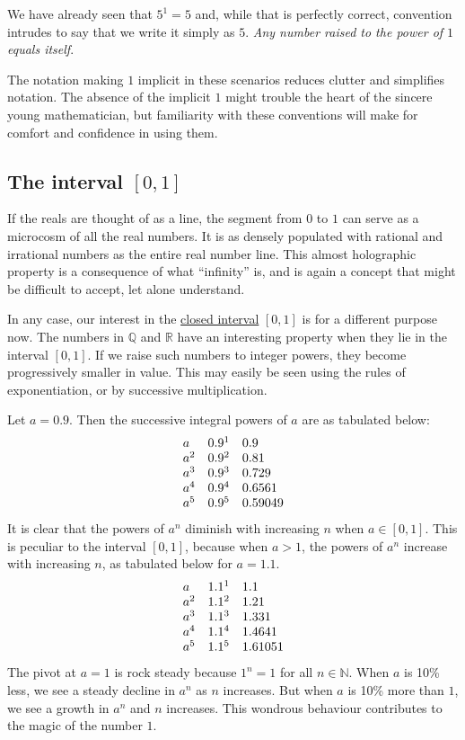 \documentclass[
  a4paper,
]{article}
\begin{document}
We have already seen that \(5^1 = 5\) and, while that is perfectly
correct, convention intrudes to say that we write it simply as \(5\).
\emph{Any number raised to the power of \(1\) equals itself}.

The notation making \(1\) implicit in these scenarios reduces clutter
and simplifies notation. The absence of the implicit \(1\) might trouble
the heart of the sincere young mathematician, but familiarity with these
conventions will make for comfort and confidence in using them.

\hypertarget{the-interval-0-1}{%
\subsection{\texorpdfstring{The interval
\([0, 1]\)}{The interval {[}0, 1{]}}}\label{the-interval-0-1}}

If the reals are thought of as a line, the segment from \(0\) to \(1\)
can serve as a microcosm of all the real numbers. It is as densely
populated with rational and irrational numbers as the entire real number
line. This almost holographic property is a consequence of what
``infinity'' is, and is again a concept that might be difficult to
accept, let alone understand.

In any case, our interest in the
\href{https://mathworld.wolfram.com/ClosedInterval.html}{closed
interval} \([0, 1]\) is for a different purpose now. The numbers in
\(\mathbb{Q}\) and \(\mathbb{R}\) have an interesting property when they
lie in the interval \([0, 1]\). If we raise such numbers to integer
powers, they become progressively smaller in value. This may easily be
seen using the rules of exponentiation, or by successive multiplication.

Let \(a = 0.9\). Then the successive integral powers of \(a\) are as
tabulated below: \[
\begin{array}{l  r  l}
a & 0.9^1 & 0.9\\
a^2 & 0.9^2 & 0.81\\
a^3 & 0.9^3 & 0.729\\
a^4 & 0.9^4 & 0.6561\\
a^5 & 0.9^5 & 0.59049\\
\end{array}
\] It is clear that the powers of \(a^n\) diminish with increasing \(n\)
when \(a \in [0, 1]\). This is peculiar to the interval \([0, 1]\),
because when \(a > 1\), the powers of \(a^n\) increase with increasing
\(n\), as tabulated below for \(a=1.1\). \[
\begin{array}{l  r  l}
a & 1.1^1 & 1.1\\
a^2 & 1.1^2 & 1.21\\
a^3 & 1.1^3 & 1.331\\
a^4 & 1.1^4 & 1.4641\\
a^5 & 1.1^5 & 1.61051\\
\end{array}
\] The pivot at \(a = 1\) is rock steady because \(1^n = 1\) for all
\(n \in \mathbb{N}\). When \(a\) is 10\% less, we see a steady decline
in \(a^n\) as \(n\) increases. But when \(a\) is 10\% more than \(1\),
we see a growth in \(a^n\) and \(n\) increases. This wondrous behaviour
contributes to the magic of the number \(1\).
\end{document}
